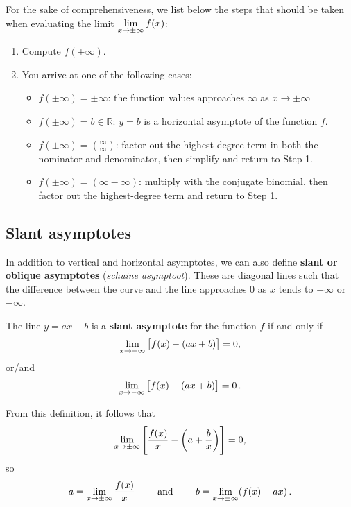 For the sake of comprehensiveness, we list below the steps that should be taken when evaluating the limit $\displaystyle\lim_{x\to \pm \infty} f(x)$:

\begin{enumerate}
\item Compute $f(\pm \infty)$.  
\item You arrive at one of the following cases:
\begin{itemize}
\item $f(\pm \infty) = \pm \infty$: the function values approaches $\infty$ as $x\to \pm \infty$
\item $ f(\pm \infty) = b \in\mathbb{R}$: $y=b$ is a horizontal asymptote of the function $f$.  
\item  $f(\pm \infty) = \left(\frac{\infty}{\infty}\right)$: factor out the highest-degree term in both the nominator and denominator, then simplify and return to Step 1. 
\item $f(\pm \infty) = (\infty - \infty)$: multiply with the conjugate binomial, then factor out the highest-degree term and return to Step 1.
\end{itemize}
\end{enumerate}



\ifcourse
\subsection{Slant asymptotes}
In addition to vertical and horizontal asymptotes, we can also define \textbf{slant or oblique asymptotes} (\textit{schuine asymptoot}). These are diagonal lines such that the difference between the curve and the line approaches 0 as $x$ tends to $+\infty$ or $-\infty$. 

\begin{definition}\label{def:slant}
The line $y=ax+b$ is a \textbf{slant asymptote} for the function $f$ if and only if
 $$\displaystyle\lim_{x\rightarrow+\infty} \left[f(x)-\left(ax+b\right)\right]=0,$$ 
or/and
$$\displaystyle\lim_{x\rightarrow-\infty} \left[f(x)-\left(ax+b\right)\right]=0\,.$$

\end{definition}
From this definition, it follows that 
\[ \displaystyle\lim_{x\rightarrow\pm\infty}\left[ \dfrac{f(x)}{x} -\left( a+\dfrac{b}{x}\right)\right]=0, \]
so
\[ a=\displaystyle\lim_{x\rightarrow\pm\infty}\dfrac{f(x)}{x} \qquad \text{ and } \qquad b=\displaystyle\lim_{x\rightarrow\pm\infty}(f(x)-ax) \, . \]


